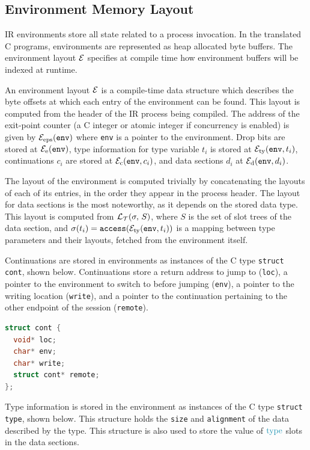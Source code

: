 \subsection{Environment Memory Layout} \label{subsection:CEnvironments}

\ac{IR} environments store all state related to a process invocation. In the translated C programs, environments are represented as heap allocated byte buffers. The environment layout $\mathcal{E}$ specifies at compile time how environment buffers will be indexed at runtime.

An environment layout $\mathcal{E}$ is a compile-time data structure which describes the byte offsets at which each entry of the environment can be found. This layout is computed from the header of the \ac{IR} process being compiled. The address of the exit-point counter (a C integer or atomic integer if concurrency is enabled) is given by $\mathcal{E}_\text{eps}(\texttt{env})$ where \texttt{env} is a pointer to the environment. Drop bits are stored at $\mathcal{E}_\text{e}(\texttt{env})$, type information for type variable $t_i$ is stored at $\mathcal{E}_\text{ty}(\texttt{env}, t_i)$, continuations $c_i$ are stored at $\mathcal{E}_\text{c}(\texttt{env}, c_i)$, and data sections $d_i$ at $\mathcal{E}_\text{d}(\texttt{env}, d_i)$.

The layout of the environment is computed trivially by concatenating the layouts of each of its entries, in the order they appear in the process header. The layout for data sections is the most noteworthy, as it depends on the stored data type. This layout is computed from $\mathcal{L}_{\mathcal{T}}(\sigma,\,S)$, where $S$ is the set of slot trees of the data section, and $\sigma(t_i) = \texttt{access}(\mathcal{E}_\text{ty}(\texttt{env}, t_i))$ is a mapping between type parameters and their layouts, fetched from the environment itself.

Continuations are stored in environments as instances of the C type \texttt{struct cont}, shown below. Continuations store a return address to jump to (\texttt{loc}), a pointer to the environment to switch to before jumping (\texttt{env}), a pointer to the writing location (\texttt{write}), and a pointer to the continuation pertaining to the other endpoint of the session (\texttt{remote}).

\begin{lstlisting}[language=C, frame=bottom]
struct cont {
  void* loc;
  char* env;
  char* write;
  struct cont* remote;
};
\end{lstlisting}

Type information is stored in the environment as instances of the C type \texttt{struct type}, shown below. This structure holds the \texttt{size} and \texttt{alignment} of the data described by the type. This structure is also used to store the value of $\types$ slots in the data sections.

